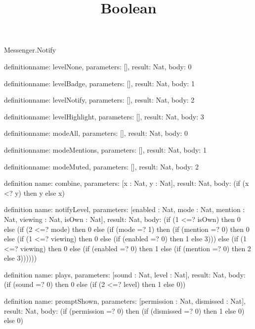 \begin{lexlean}{Messenger.Notify}
\title{Boolean}
\begin{semanticmodule}
definition{name: levelNone, parameters: [], result: Nat, body: 0}

definition{name: levelBadge, parameters: [], result: Nat, body: 1}

definition{name: levelNotify, parameters: [], result: Nat, body: 2}

definition{name: levelHighlight, parameters: [], result: Nat, body: 3}

definition{name: modeAll, parameters: [], result: Nat, body: 0}

definition{name: modeMentions, parameters: [], result: Nat, body: 1}

definition{name: modeMuted, parameters: [], result: Nat, body: 2}

definition{
  name: combine,
  parameters: [x : Nat, y : Nat],
  result: Nat,
  body: (if (x <? y) then y else x)
}

definition{
  name: notifyLevel,
  parameters: [enabled : Nat, mode : Nat, mention : Nat, viewing : Nat, isOwn : Nat],
  result: Nat,
  body: (if (1 <=? isOwn) then 0 else (if (2 <=? mode) then 0 else (if (mode =? 1) then (if (mention =? 0) then 0 else (if (1 <=? viewing) then 0 else (if (enabled =? 0) then 1 else 3))) else (if (1 <=? viewing) then 0 else (if (enabled =? 0) then 1 else (if (mention =? 0) then 2 else 3))))))
}

definition{
  name: plays,
  parameters: [sound : Nat, level : Nat],
  result: Nat,
  body: (if (sound =? 0) then 0 else (if (2 <=? level) then 1 else 0))
}

definition{
  name: promptShown,
  parameters: [permission : Nat, dismissed : Nat],
  result: Nat,
  body: (if (permission =? 0) then (if (dismissed =? 0) then 1 else 0) else 0)
}
\end{semanticmodule}
\end{lexlean}
